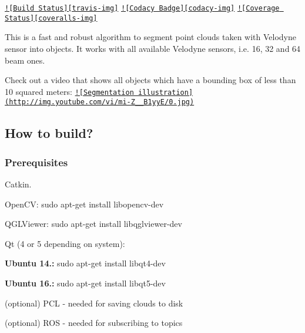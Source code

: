 \href{https://travis-ci.org/niosus/depth_clustering}{\tt !\mbox{[}Build Status\mbox{]}\mbox{[}travis-\/img\mbox{]}} \href{https://www.codacy.com/app/zabugr/depth_clustering?utm_source=github.com&amp;utm_medium=referral&amp;utm_content=niosus/depth_clustering&amp;utm_campaign=Badge_Grade}{\tt !\mbox{[}Codacy Badge\mbox{]}\mbox{[}codacy-\/img\mbox{]}} \href{https://coveralls.io/github/niosus/depth_clustering?branch=master}{\tt !\mbox{[}Coverage Status\mbox{]}\mbox{[}coveralls-\/img\mbox{]}}

This is a fast and robust algorithm to segment point clouds taken with Velodyne sensor into objects. It works with all available Velodyne sensors, i.\-e. 16, 32 and 64 beam ones.

Check out a video that shows all objects which have a bounding box of less than 10 squared meters\-: \href{https://www.youtube.com/watch?v=mi-Z__B1yyE}{\tt !\mbox{[}Segmentation illustration\mbox{]}(http\-://img.\-youtube.\-com/vi/mi-\/\-Z\-\_\-\-\_\-\-B1yy\-E/0.\-jpg)}

\subsection*{How to build?}

\subsubsection*{Prerequisites}


\begin{DoxyItemize}
\item Catkin.
\item Open\-C\-V\-: {\ttfamily sudo apt-\/get install libopencv-\/dev}
\item Q\-G\-L\-Viewer\-: {\ttfamily sudo apt-\/get install libqglviewer-\/dev}
\item Qt (4 or 5 depending on system)\-:
\begin{DoxyItemize}
\item {\bfseries Ubuntu 14.\-:} {\ttfamily sudo apt-\/get install libqt4-\/dev}
\item {\bfseries Ubuntu 16.\-:} {\ttfamily sudo apt-\/get install libqt5-\/dev}
\end{DoxyItemize}
\item (optional) P\-C\-L -\/ needed for saving clouds to disk
\item (optional) R\-O\-S -\/ needed for subscribing to topics
\end{DoxyItemize}


